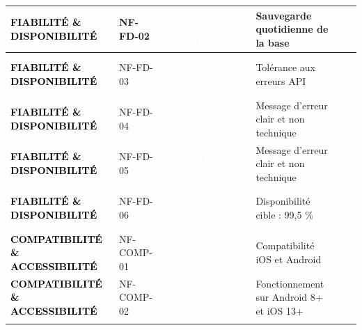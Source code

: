 \begin{longtable}{|P{2.15cm}|P{1.55cm}|P{2.35cm}|P{5.60cm}|P{1.65cm}|P{1.45cm}|}
\textcolor{black}{\textbf{FIABILITÉ \& DISPONIBILITÉ}} & NF-FD-02 & \textcolor{white}{\textbf{Sécurité, Infrastructure \& RGPD}} & Sauvegarde quotidienne de la base &  &  \\ \hline
{}
\textcolor{black}{\textbf{FIABILITÉ \& DISPONIBILITÉ}} & NF-FD-03 & \textcolor{white}{\textbf{Backend / API \& Base de Données}} & Tolérance aux erreurs API &  &  \\ \hline
{}
\textcolor{black}{\textbf{FIABILITÉ \& DISPONIBILITÉ}} & NF-FD-04 & \textcolor{white}{\textbf{Application Apprenant}} & Message d’erreur clair et non technique &  &  \\ \hline
{}
\textcolor{black}{\textbf{FIABILITÉ \& DISPONIBILITÉ}} & NF-FD-05 & \textcolor{white}{\textbf{Tableau de bord Administrateur}} & Message d’erreur clair et non technique &  &  \\ \hline
{}
\textcolor{black}{\textbf{FIABILITÉ \& DISPONIBILITÉ}} & NF-FD-06 & \textcolor{white}{\textbf{Sécurité, Infrastructure \& RGPD}} & Disponibilité cible : 99,5 \% &  &  \\ \hline
{}
\textcolor{black}{\textbf{COMPATIBILITÉ \& ACCESSIBILITÉ}} & NF-COMP-01 & \textcolor{white}{\textbf{Application Apprenant}} & Compatibilité iOS et Android &  &  \\ \hline
{}
\textcolor{black}{\textbf{COMPATIBILITÉ \& ACCESSIBILITÉ}} & NF-COMP-02 & \textcolor{white}{\textbf{Application Apprenant}} & Fonctionnement sur Android 8+ et iOS 13+ &  &  \\ \hline
{}

\end{longtable}
